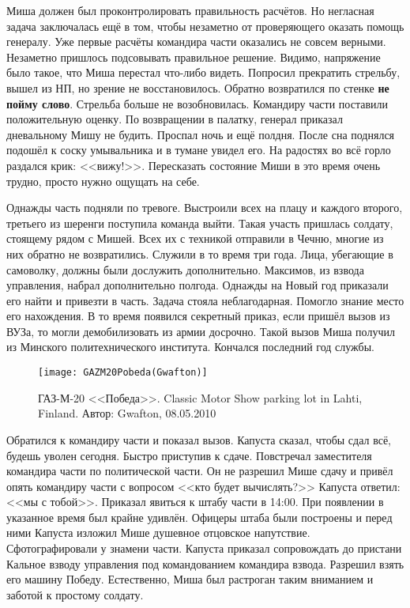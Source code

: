 Миша должен был проконтролировать правильность расчётов. Но негласная задача заключалась ещё в том, чтобы незаметно от проверяющего оказать помощь генералу. Уже первые расчёты командира части оказались не совсем верными. Незаметно пришлось подсовывать правильное решение. Видимо, напряжение было такое, что Миша перестал что-либо видеть. Попросил прекратить стрельбу, вышел из НП, но зрение не восстановилось. Обратно возвратился по стенке \textbf{не пойму слово}. Стрельба больше не возобновилась. Командиру части поставили положительную оценку. По возвращении в палатку, генерал приказал дневальному Мишу не будить. Проспал ночь и ещё полдня. После сна поднялся подошёл к соску умывальника и в тумане увидел его. На радостях во всё горло раздался крик: <<вижу!>>. Пересказать состояние Миши в это время очень трудно, просто нужно ощущать на себе.

Однажды часть подняли по тревоге. Выстроили всех на плацу и каждого второго, третьего из шеренги поступила команда выйти. Такая участь пришлась солдату, стоящему рядом с Мишей. Всех их с техникой отправили в Чечню, многие из них обратно не возвратились. Служили в то время три года. Лица, убегающие в самоволку, должны были дослужить дополнительно. Максимов, из взвода управления, набрал дополнительно полгода. Однажды на Новый год приказали его найти и привезти в часть. Задача стояла неблагодарная. Помогло знание место его нахождения. В то время появился секретный приказ, если пришёл вызов из ВУЗа, то могли демобилизовать из армии досрочно. Такой вызов Миша получил из Минского политехнического института. Кончался последний год службы.

\begin{wrapfigure}{O}{.4\textwidth}
\centering
\texttt{[image: GAZM20Pobeda(Gwafton)]}
\caption{ГАЗ-М-20 <<Победа>>. Classic Motor Show parking lot in Lahti, Finland. Автор: Gwafton, 08.05.2010}
\label{fig:GAZM20Pobeda(Gwafton)}
\end{wrapfigure}

Обратился к командиру части и показал вызов. Капуста сказал, чтобы сдал всё, будешь уволен сегодня. Быстро приступив к сдаче. Повстречал заместителя командира части по политической части. Он не разрешил Мише сдачу и привёл опять командиру части с вопросом <<кто будет вычислять?>> Капуста ответил: <<мы с тобой>>. Приказал явиться к штабу части в 14:00. При появлении в указанное время был крайне удивлён. Офицеры штаба были построены и перед ними Капуста изложил Мише душевное отцовское напутствие. Сфотографировали у знамени части. Капуста приказал сопровождать до пристани Кальное взводу управления под командованием командира взвода. Разрешил взять его машину Победу. Естественно, Миша был растроган таким вниманием и заботой к простому солдату. 

